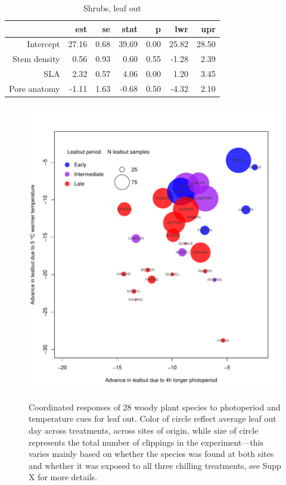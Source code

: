 \documentclass[12pt]{article}
\begin{document}
\begin{table}[ht]
\centering
\caption{Shrubs, leaf out} 
\begin{tabular}{rrrrrrr}
  \hline
 & est & se & stat & p & lwr & upr \\ 
  \hline
Intercept & 27.16 & 0.68 & 39.69 & 0.00 & 25.82 & 28.50 \\ 
  Stem density & 0.56 & 0.93 & 0.60 & 0.55 & -1.28 & 2.39 \\ 
  SLA & 2.32 & 0.57 & 4.06 & 0.00 & 1.20 & 3.45 \\ 
  Pore anatomy & -1.11 & 1.63 & -0.68 & 0.50 & -4.32 & 2.10 \\ 
   \hline
\end{tabular}
\end{table}

\begin{figure} %
\begin{center}
\caption{Coordinated responses of 28 woody plant species to photoperiod and temperature cues for leaf out. Color of circle reflect average leaf out day across treatments, across sites of origin, while size of circle represents the total number of clippings in the experiment---this varies mainly based on whether the species was found at both sites and whether it was exposed to all three chilling treatments, see Supp X for more details.} %
\includegraphics[scale=0.5]{Advplot2}
\label{fig1}
\end{center}
\end{figure}
\end{document}
